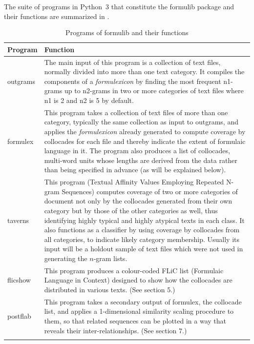 \documentclass[output=paper]{langscibook}
\begin{document}
The suite of programs in Python~3 that constitute the formulib package and their functions are summarized in .

\begin{table}
\caption{Programs of formulib and their functions}
\label{tab:3}
\begin{tabularx}{\textwidth}{>{\ttfamily}lQ}
\lsptoprule
Program & Function\\
\midrule
outgrams & The main input of this program is a collection of text files, normally divided into more than one text category. It compiles the components of a \textit{formulexicon} by finding the most frequent n1-grams up to n2-grams in two or more categories of text files where n1 is 2 and n2 is 5 by default.\\
formulex & This program takes a collection of text files of more than one category, typically the same collection as input to outgrams, and applies the \textit{formulexicon} already generated to compute coverage by collocades for each file and thereby indicate the extent of formulaic language in it. The program also produces a list of collocades, multi-word units whose lengths are derived from the data rather than being specified in advance (as will be explained below).\\
taverns & This program (Textual Affinity Values Employing Repeated N-gram Sequences) computes coverage of two or more categories of document not only by the collocades generated from their own category but by those of the other categories as well, thus identifying highly typical and highly atypical texts in each class. It also functions as a classifier by using coverage by collocades from all categories, to indicate likely category membership. Usually its input will be a holdout sample of text files which were not used in generating the $n$-gram lists.\\
flicshow & This program produces a colour-coded FLiC list (Formulaic Language in Context) designed to show how the collocades are distributed in various texts. (See section 5.)\\
postflab & This program takes a secondary output of formulex, the collocade list, and applies a 1-dimensional similarity scaling procedure to them, so that related sequences can be plotted in a way that reveals their inter-relationships. (See section 7.)\\
\lspbottomrule
\end{tabularx}
\end{table}
\end{document}
